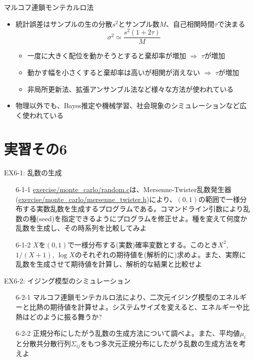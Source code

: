 \documentclass[dvipdfmx]{beamer}
\begin{document}
\begin{frame}[t,fragile]{マルコフ連鎖モンテカルロ法}
  \begin{itemize}
  \item 統計誤差はサンプルの生の分散$s^2$とサンプル数$M$、自己相関時間$\tau$で決まる
    \[
    \sigma^2 \simeq \frac{s^2 (1+2\tau)}{M}
    \]
    \begin{itemize}
    \item 一度に大きく配位を動かそうとすると棄却率が増加 $\Rightarrow$ $\tau$が増加
    \item 動かす幅を小さくすると棄却率は高いが相関が消えない $\Rightarrow$ $\tau$が増加
    \item 非局所更新法、拡張アンサンブル法など様々な方法が使われている
    \end{itemize}
  \item 物理以外でも、Bayes推定や機械学習、社会現象のシミュレーションなど広く使われている
  \end{itemize}
\end{frame}

\section{実習その6}

\begin{frame}[t,fragile]{EX6-1: 乱数の生成}
  \begin{itemize}
  \item[6-1-1] \href{https://github.com/todo-group/computer-experiments/blob/master/exercise/monte_carlo/random.c}{exercise/monte\_carlo/random.c}は、Mersenne-Twister乱数発生器(\href{https://github.com/todo-group/computer-experiments/blob/master/exercise/monte_carlo/mersenne_twister.c}{exercise/monte\_carlo/mersenne\_twister.h})により、$(0,1)$の範囲で一様分布する実数乱数を生成するプログラムである。コマンドライン引数により乱数の種(seed)を指定できるようにプログラムを修正せよ。種を変えて何度か乱数を生成し、その時系列を比較してみよ
  \item[6-1-2] $X$を$(0,1)$で一様分布する(実数)確率変数とする。このとき$X^2$, $1/(X+1)$, $\log X$のそれぞれの期待値を(解析的に)求めよ。また、実際に乱数を生成させて期待値を計算し、解析的な結果と比較せよ
  \end{itemize}
\end{frame}

\begin{frame}[t,fragile]{EX6-2: イジング模型のシミュレーション}
  \begin{itemize}
  \item[6-2-1] マルコフ連鎖モンテカルロ法により、二次元イジング模型のエネルギーと比熱の期待値を計算せよ。システムサイズを変えると、エネルギーや比熱はどのように振る舞うか?
  \item[6-2-2] 正規分布にしたがう乱数の生成方法について調べよ。また、平均値$\mu_i$と分散共分散行列$\Sigma_{ij}$をもつ多次元正規分布にしたがう乱数の生成方法を考えよ
  \end{itemize}
\end{frame}
\end{document}

